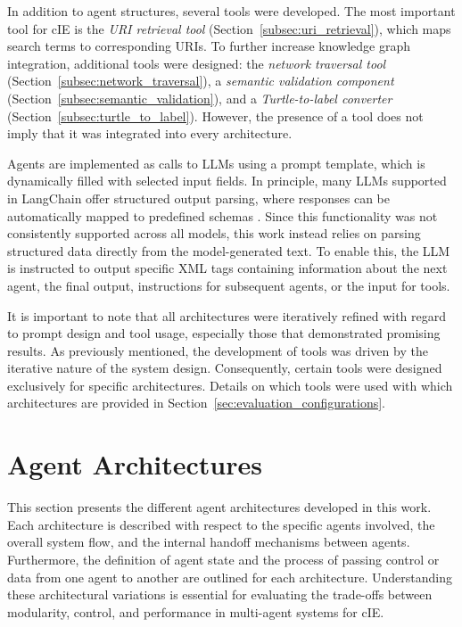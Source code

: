 \documentclass[a4paper,oneside,bibliography=totoc]{scrbook}
\begin{document}
In addition to agent structures, several tools were developed. The most important tool for \ac{cIE} is the \textit{URI retrieval tool} (Section~\ref{subsec:uri_retrieval}), which maps search terms to corresponding URIs. To further increase knowledge graph integration, additional tools were designed: the \textit{network traversal tool} (Section~\ref{subsec:network_traversal}), a \textit{semantic validation component} (Section~\ref{subsec:semantic_validation}), and a \textit{Turtle-to-label converter} (Section~\ref{subsec:turtle_to_label}). However, the presence of a tool does not imply that it was integrated into every architecture.

Agents are implemented as calls to \acp{LLM} using a prompt template, which is dynamically filled with selected input fields. In principle, many \acp{LLM} supported in LangChain offer structured output parsing, where responses can be automatically mapped to predefined schemas \cite{LangChain2025e}. Since this functionality was not consistently supported across all models, this work instead relies on parsing structured data directly from the model-generated text. To enable this, the \ac{LLM} is instructed to output specific XML tags containing information about the next agent, the final output, instructions for subsequent agents, or the input for tools.

It is important to note that all architectures were iteratively refined with regard to prompt design and tool usage, especially those that demonstrated promising results. As previously mentioned, the development of tools was driven by the iterative nature of the system design. Consequently, certain tools were designed exclusively for specific architectures. Details on which tools were used with which architectures are provided in Section~\ref{sec:evaluation_configurations}.

\section{Agent Architectures}
\label{sec:agent_architectures}

This section presents the different agent architectures developed in this work. Each architecture is described with respect to the specific agents involved, the overall system flow, and the internal handoff mechanisms between agents. Furthermore, the definition of agent state and the process of passing control or data from one agent to another are outlined for each architecture. Understanding these architectural variations is essential for evaluating the trade-offs between modularity, control, and performance in multi-agent systems for \ac{cIE}.
\end{document}
